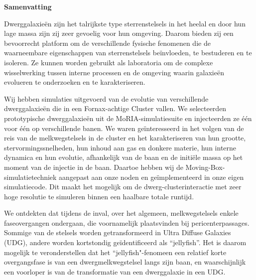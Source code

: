 \clearpage
\thispagestyle{empty}
\null%
\begin{center}
  {\Large \textbf{Samenvatting}}\\
\end{center}

Dwerggalaxieën zijn het talrijkste type sterrenstelsels in het heelal en door hun lage massa zijn zij zeer gevoelig voor hun omgeving.
Daarom bieden zij een bevoorrecht platform om de verschillende fysische fenomenen die de waarneembare eigenschappen van sterrenstelsels beïnvloeden, te bestuderen en te isoleren.
Ze kunnen worden gebruikt als laboratoria om de complexe wisselwerking tussen interne processen en de omgeving waarin galaxieën evolueren te onderzoeken en te karakteriseren.

Wij hebben simulaties uitgevoerd van de evolutie van verschillende dwerggalaxieën die in een Fornax-achtige Cluster vallen.
We selecteerden prototypische dwerggalaxieën uit de MoRIA-simulatiesuite en injecteerden ze één voor één op verschillende banen.
We waren geïnteresseerd in het volgen van de reis van de melkwegstelsels in de cluster en het karakteriseren van hun grootte, stervormingssnelheden, hun inhoud aan gas en donkere materie, hun interne dynamica en hun evolutie, afhankelijk van de baan en de initiële massa op het moment van de injectie in de baan.
Daartoe hebben wij de Moving-Box-simulatietechniek aangepast aan onze noden en geïmplementeerd in onze eigen simulatiecode.
Dit maakt het mogelijk om de dwerg-clusterinteractie met zeer hoge resolutie te simuleren binnen een haalbare totale runtijd.

We ontdekten dat tijdens de inval, over het algemeen, melkwegstelsels enkele faseovergangen ondergaan, die voornamelijk  plaatsvinden bij pericenterpassages.
Sommige van de stelsels  worden getransformeerd in Ultra Diffuse Galaxies (UDG), andere worden kortstondig geïdentificeerd als ``jellyfish''.
Het is daarom mogelijk te veronderstellen dat het ``jellyfish"-fenomeen een relatief korte overgangsfase is van een dwergmelkwegstelsel langs zijn baan, en waarschijnlijk een voorloper is van de transformatie van een dwerggalaxie in een UDG.

